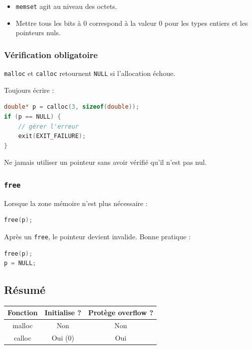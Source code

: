 \begin{itemize}
    \item \texttt{memset} agit au niveau des octets.
    \item Mettre tous les bits à 0 correspond à la valeur 0
          pour les types entiers et les pointeurs nuls.
\end{itemize}

\subsubsection{Vérification obligatoire}

\texttt{malloc} et \texttt{calloc} retournent \texttt{NULL}
si l’allocation échoue.

Toujours écrire :

\begin{lstlisting}[language=C]
double* p = calloc(3, sizeof(double));
if (p == NULL) {
    // gérer l'erreur
    exit(EXIT_FAILURE);
}
\end{lstlisting}

Ne jamais utiliser un pointeur sans avoir vérifié qu’il n’est pas nul.

\subsubsection{\texttt{free}}

Lorsque la zone mémoire n’est plus nécessaire :

\begin{lstlisting}[language=C]
free(p);
\end{lstlisting}

Après un \texttt{free}, le pointeur devient invalide.
Bonne pratique :

\begin{lstlisting}[language=C]
free(p);
p = NULL;
\end{lstlisting}

\subsection*{Résumé}

\begin{center}
\begin{tabular}{|c|c|c|}
\hline
Fonction & Initialise ? & Protège overflow ? \\
\hline
malloc & Non & Non \\
calloc & Oui (0) & Oui \\
\hline
\end{tabular}
\end{center}

